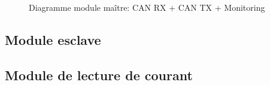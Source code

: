 		\begin{figure}[H]
			\centering
			\caption{Diagramme module maître: CAN RX + CAN TX + Monitoring }
			\label{fig:diagrammefonctionnelcanmonitoring}
		\end{figure}
		
		
	\subsection{Module esclave}
		\paragraph*{}
		
		
	\subsection{Module de lecture de courant}
		\paragraph*{}
		
		
